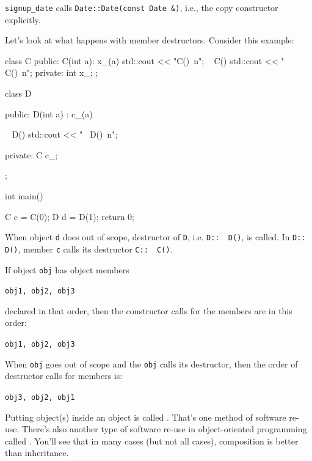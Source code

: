 \verb!signup_date! calls \verb!Date::Date(const Date &)!, i.e., the
copy constructor explicitly.

\newpage{}

Let's look at what happens with member destructors.
Consider this example:

\begin{console}
class C
{
public:
        C(int a): x_(a)
        {
             std::cout << "C()\ n";
        }
        ~ C()
        {
             std::cout << "~ C()\ n";
        }
private:
        int x_;
};

class D
{
public:
        D(int a)
            : c_(a)
        {}
        
        ~ D()
        {
            std::cout << "~ D()\ n";
        }
        
private:
        C c_;
};

int main()
{   
    C c = C(0);
    D d = D(1);
    return 0;

}
\end{console}

When object \texttt{d} does out of scope, destructor of \texttt{D}, i.e.
\texttt{D::~ D()}, is called. In
\texttt{D::~ D()}, member \texttt{c} calls its destructor
\texttt{C::~ C()}.

\newpage{}

If object \texttt{obj} has object members
\begin{center}
\texttt{obj1, obj2, obj3}
\end{center}
declared in that order, then the constructor calls for the members are
in this order:
\begin{center}
\texttt{obj1, obj2, obj3 }
\end{center}
When \texttt{obj} goes out of scope and the \texttt{obj} calls its
destructor, then the order of destructor calls for members is:
\begin{center}
\texttt{obj3, obj2, obj1}
\end{center}
\newpage{}

Putting object(s) inside an object is called .
That's one method of software re-use. There's also another type of software re-use in object-oriented programming called . You'll see that in many cases (but not all cases), composition is better than inheritance.


\newpage{}

